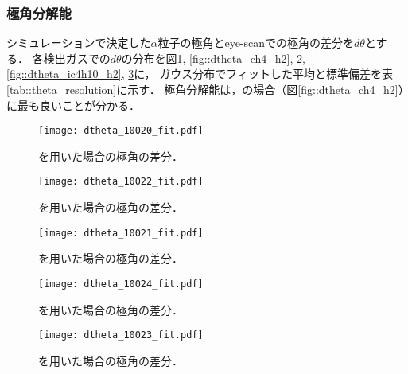 \documentclass[../master]{subfiles}
\begin{document}
\subsubsection{極角分解能}
シミュレーションで決定した$\alpha$粒子の極角とeye-scanでの極角の差分を$d\theta$とする．
各検出ガスでの$d\theta$の分布を図\ref{fig::dtheta_ch4}, \ref{fig::dtheta_ch4_h2}, \ref{fig::dtheta_ch4_he},
\ref{fig::dtheta_ic4h10_h2}, \ref{fig::dtheta_ic4h10_he}に，
ガウス分布でフィットした平均と標準偏差を表\ref{tab::theta_resolution}に示す．
極角分解能は，\MethaneHydro の場合（図\ref{fig::dtheta_ch4_h2}）に最も良いことが分かる．
\begin{figure}
  \centering
  \begin{minipage}{0.45\columnwidth}
    \centering
    \texttt{[image: dtheta\_10020\_fit.pdf]}
    \caption{\Methane を用いた場合の極角の差分．}
    \label{fig::dtheta_ch4}
  \end{minipage}  
\end{figure}
\begin{figure}
  \centering
  \begin{minipage}{0.45\columnwidth}
    \centering
    \texttt{[image: dtheta\_10022\_fit.pdf]}
    \caption{\MethaneHydro を用いた場合の極角の差分．}
    \label{fig::dtheta_ch4_h2}
  \end{minipage}
  \begin{minipage}{0.45\columnwidth}
    \centering
    \texttt{[image: dtheta\_10021\_fit.pdf]}
    \caption{\MethaneHerium を用いた場合の極角の差分．}
    \label{fig::dtheta_ch4_he}
  \end{minipage}
\end{figure}
\begin{figure}
  \centering
  \begin{minipage}{0.45\columnwidth}
    \centering
    \texttt{[image: dtheta\_10024\_fit.pdf]}
    \caption{\isoButaneHydro を用いた場合の極角の差分．}
    \label{fig::dtheta_ic4h10_h2}
  \end{minipage}
  \begin{minipage}{0.45\columnwidth}
    \centering
    \texttt{[image: dtheta\_10023\_fit.pdf]}
    \caption{\isoButaneHerium を用いた場合の極角の差分．}
    \label{fig::dtheta_ic4h10_he}
  \end{minipage}
\end{figure}
\end{document}
